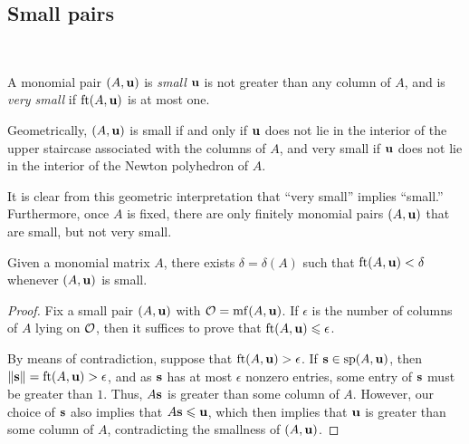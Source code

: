 \documentclass[11pt]{amsart}
\begin{document}
\subsection{Small pairs}

\ 

\begin{definition}
A monomial pair $(A, \mathbf{u})$ is \emph{small} $\mathbf{u}$ is not greater than any column of $A$, and is \emph{very small} if $\operatorname{ft}(A, \mathbf{u})$ is at most one.
\end{definition}

\begin{remark}
\label{finitely many small but not very small: R}
Geometrically, $(A, \mathbf{u})$ is small if and only if $\mathbf{u}$ does not lie in the interior of the upper staircase associated with the columns of $A$, and very small if $\mathbf{u}$ does not lie in the interior of the Newton polyhedron of $A$.

It is clear from this geometric interpretation that ``very small'' implies ``small.''  Furthermore, once $A$ is fixed, there are only finitely monomial pairs $(A, \mathbf{u})$ that are small, but not very small. 
\end{remark}

\begin{lemma}
\label{refined-discreteness: L}
Given a monomial matrix $A$, there exists $\delta = \delta(A)$ such that $\operatorname{ft}(A, \mathbf{u}) < \delta$ whenever $(A, \mathbf{u})$ is small.
\end{lemma}

\begin{proof}   Fix a small pair $(A, \mathbf{u})$ with $\mathcal{O} = \operatorname{mf}(A, \mathbf{u})$.  If $\epsilon$ is the number of columns of $A$ lying on $\mathcal{O}$, then it suffices to prove that $\operatorname{ft}(A, \mathbf{u}) \leqslant \epsilon$.

By means of contradiction, suppose that $\operatorname{ft}(A, \mathbf{u}) > \epsilon$.  If $\mathbf{s} \in \operatorname{sp}(A,\mathbf{u})$, then $\| \mathbf{s} \| = \operatorname{ft}(A, \mathbf{u}) > \epsilon$, and as $\mathbf{s}$ has at most $\epsilon$ nonzero entries, some entry of $\mathbf{s}$ must be greater than $1$.  Thus, $A \mathbf{s}$ is greater than some column of $A$.  However, our choice of $\mathbf{s}$ also implies that $A \mathbf{s} \leqslant \mathbf{u}$, which then implies that $\mathbf{u}$ is greater than some column of $A$, contradicting the smallness of $(A, \mathbf{u})$.
\end{proof}
\end{document}
